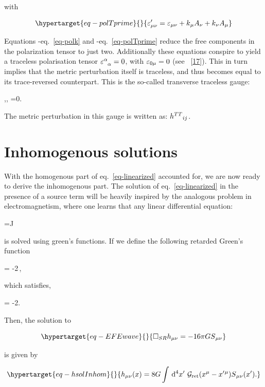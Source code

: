 \documentclass[
  10pt,
  a4paper,
  DIV=11,
  numbers=noendperiod,
  twoside]{scrreprt}
\let\[\relax \let\]\relax %
\DeclareRobustCommand{\[}{\begin{equation}}
\DeclareRobustCommand{\]}{\end{equation}}
\begin{document}
with

\begin{equation}\protect\hypertarget{eq-polTprime}{}{
\polTensor'_{\mu\nu} = \polco + \co{k}\co[\nu]{A} + \co[\nu]{k}\co{A}
}\label{eq-polTprime}\end{equation}

Equations -eq.~\ref{eq-polk} and -eq.~\ref{eq-polTprime} reduce the free
components in the polarization tensor to just two. Additionally these
equations conspire to yield a traceless polarisation tensor
\(\trpol=0\), with \(\polco[0\mu]=0\) (see
~{[}\protect\hyperlink{ref-Carroll:2019}{17}{]}). This in turn implies
that the metric perturbation itself is traceless, and thus becomes equal
to its trace-reversed counterpart. This is the so-called transverse
traceless gauge:

\[
,\quad {}, \quad \ipdv[^]{\weakmet}{\nu}=0.
\]

The metric perturbation in this gauge is written as: \(\weakTTmet\).

\hypertarget{inhomogenous-solutions}{%
\section{Inhomogenous solutions}\label{inhomogenous-solutions}}

With the homogenous part of eq.~\ref{eq-linearized} accounted for, we
are now ready to derive the inhomogenous part. The solution of
eq.~\ref{eq-linearized} in the presence of a source term will be heavily
inspired by the analogous problem in electromagnetism, where one learns
that any linear differential equation:

\[\phi=J\]

is solved using green's functions. If we define the following retarded
Green's function

\[
     = -2\pi\,,
\]

which satisfies,

\[
    \SRDA{} = -2\pi {}.
\]

Then, the solution to

\begin{equation}\protect\hypertarget{eq-EFEwave}{}{
 \SRDA \weakmet =  -16 \pi \grav \srcco
}\label{eq-EFEwave}\end{equation}

is given by

\begin{equation}\protect\hypertarget{eq-hsolInhom}{}{
    \weakmet(x) = 8G\int\dd[4]{x'}\,\greens{\ct{x}-\ct{x'}}\srcco(x').
}\label{eq-hsolInhom}\end{equation}
\end{document}
